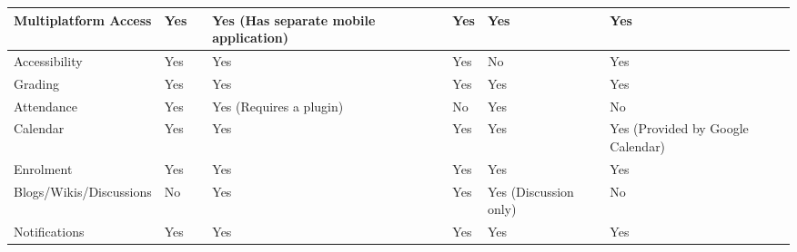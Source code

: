 \begin{table}[ht]
{\begin{tabular}{llllllll}
        \multicolumn{1}{|l|}{Multiplatform Access}        & \multicolumn{1}{l|}{Yes} & \multicolumn{1}{l|}{} & \multicolumn{1}{l|}{Yes (Has separate mobile application)} & \multicolumn{1}{l|}{} & \multicolumn{1}{l|}{Yes}                       & \multicolumn{1}{l|}{Yes} & \multicolumn{1}{l|}{Yes} \\ \hline
        \multicolumn{1}{|l|}{Accessibility}               & \multicolumn{1}{l|}{Yes} & \multicolumn{1}{l|}{} & \multicolumn{1}{l|}{Yes} & \multicolumn{1}{l|}{} & \multicolumn{1}{l|}{Yes}                       & \multicolumn{1}{l|}{No} & \multicolumn{1}{l|}{Yes} \\ \hline
        \multicolumn{1}{|l|}{Grading}                     & \multicolumn{1}{l|}{Yes} & \multicolumn{1}{l|}{} & \multicolumn{1}{l|}{Yes} & \multicolumn{1}{l|}{} & \multicolumn{1}{l|}{Yes}                       & \multicolumn{1}{l|}{Yes} & \multicolumn{1}{l|}{Yes} \\ \hline
        \multicolumn{1}{|l|}{Attendance}                  & \multicolumn{1}{l|}{Yes} & \multicolumn{1}{l|}{} & \multicolumn{1}{l|}{Yes (Requires a plugin)} & \multicolumn{1}{l|}{} & \multicolumn{1}{l|}{No}                        & \multicolumn{1}{l|}{Yes} & \multicolumn{1}{l|}{No} \\ \hline
        \multicolumn{1}{|l|}{Calendar}                    & \multicolumn{1}{l|}{Yes} & \multicolumn{1}{l|}{} & \multicolumn{1}{l|}{Yes} & \multicolumn{1}{l|}{} & \multicolumn{1}{l|}{Yes}                       & \multicolumn{1}{l|}{Yes} & \multicolumn{1}{l|}{Yes (Provided by Google Calendar)} \\ \hline
        \multicolumn{1}{|l|}{Enrolment}                   & \multicolumn{1}{l|}{Yes} & \multicolumn{1}{l|}{} & \multicolumn{1}{l|}{Yes} & \multicolumn{1}{l|}{} & \multicolumn{1}{l|}{Yes}                       & \multicolumn{1}{l|}{Yes} & \multicolumn{1}{l|}{Yes} \\ \hline
        \multicolumn{1}{|l|}{Blogs/Wikis/Discussions}     & \multicolumn{1}{l|}{No} & \multicolumn{1}{l|}{} & \multicolumn{1}{l|}{Yes} & \multicolumn{1}{l|}{} & \multicolumn{1}{l|}{Yes}                       & \multicolumn{1}{l|}{Yes (Discussion only)} & \multicolumn{1}{l|}{No} \\ \hline
        \multicolumn{1}{|l|}{Notifications}               & \multicolumn{1}{l|}{Yes} & \multicolumn{1}{l|}{} & \multicolumn{1}{l|}{Yes} & \multicolumn{1}{l|}{} & \multicolumn{1}{l|}{Yes}                       & \multicolumn{1}{l|}{Yes} & \multicolumn{1}{l|}{Yes} \\ \hline

\end{tabular}}
\end{table}
